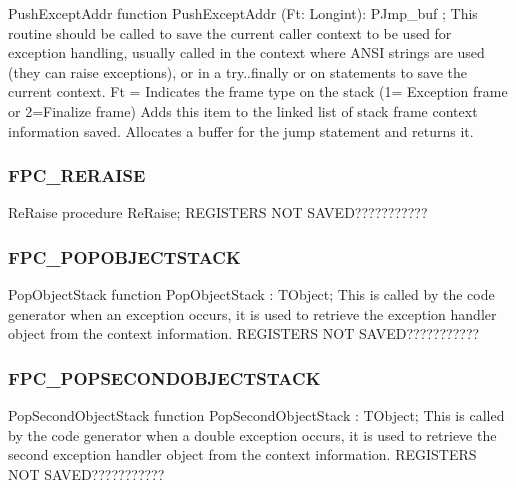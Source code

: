 \documentclass [a4paper,12pt]{article}
\begin{document}
\begin{function}{PushExceptAddr}
\Declaration
function PushExceptAddr (Ft: Longint): PJmp{\_}buf ;
\Description
This routine should be called to save the current caller context to be used
for exception handling, usually called in the context where ANSI strings are
used (they can raise exceptions), or in a try..finally or on statements to
save the current context.
\Parameters 
Ft = Indicates the frame type on the stack (1= Exception frame or 2=Finalize
frame)
\Algorithm
Adds this item to the linked list of stack frame context information saved.
Allocates a buffer for the jump statement and returns it.
\end{function}

\subsubsection{FPC{\_}RERAISE}
\label{subsubsec:mylabel62}

\begin{procedure}{ReRaise}
\Declaration
procedure ReRaise;
\Notes
REGISTERS NOT SAVED???????????
\end{procedure}

\subsubsection{FPC{\_}POPOBJECTSTACK}
\label{subsubsec:mylabel63}

\begin{function}{PopObjectStack}
\Declaration
function PopObjectStack : TObject;
\Description
This is called by the code generator when an exception occurs, it is used to
retrieve the exception handler object from the context information.
\Notes
REGISTERS NOT SAVED???????????
\end{function}

\subsubsection{FPC{\_}POPSECONDOBJECTSTACK}
\label{subsubsec:mylabel64}

\begin{function}{PopSecondObjectStack}
\Declaration
function PopSecondObjectStack : TObject;
\Description
This is called by the code generator when a double exception occurs, it is
used to retrieve the second exception handler object from the context
information.
\Notes
REGISTERS NOT SAVED???????????
\end{function}
\end{document}
